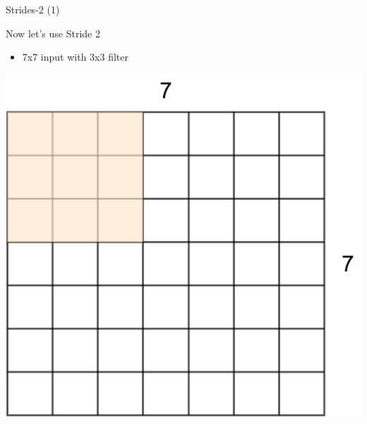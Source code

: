 \documentclass[default, aspectratio=169]{beamer}
\begin{document}
	\begin{frame}{Strides-2 (1)}
		\vspace{0.5cm}
		
		\normalsize \color{red}Now let's use Stride 2
		\begin{itemize}
			\item 7x7 input with 3x3 filter
		\end{itemize}
		
		\centering
		\includegraphics[keepaspectratio, scale=0.25]{pic/Stride6.png}
	\end{frame}
		
\end{document}
